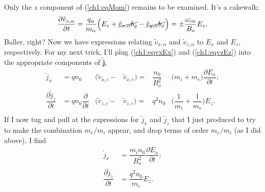 Only the $z$ component of (\ref{ch1:eqMom}) remains to be examined. It's a cakewalk:
\begin{equation} \label{ch1:eqvzEz} \dfrac{\partial \tilde
    v_{z,\alpha}}{\partial t} = \dfrac{q_\alpha}{m_\alpha} \Big ( E_z +
  \cancel{\tilde v_{x,\alpha} b_y} - \cancel{\tilde v_{y,\alpha} b_x} \Big ) =
  \pm \dfrac{\omega_{c \alpha}}{B_o} E_z.
\end{equation}
Baller, right? Now we have expressions relating $\tilde v_{x,\alpha}$ and
$\tilde v_{z,\alpha}$ to $E_x$ and $E_z$, respectively. For my next trick, I'll
plug (\ref{ch1:eqvxEx}) and (\ref{ch1:eqvzEz}) into the appropriate components
of $\mathbf{\tilde j}$,
\begin{equation*} 
  \begin{alignedat}{4}
    \tilde j_x                              &= q n_0 &\Big ( \tilde v_{x,i} - & \tilde v_{x,e} \Big ) = & \dfrac{n_0}{B_o^2} &\Big( m_i + m_e \Big) \dfrac{\partial E_x}{\partial t}; \\
    \dfrac{\partial \tilde j_z}{\partial t} &= q n_0 \dfrac{\partial}{\partial t} &\Big ( \tilde v_{z,i} - & \tilde v_{z,e} \Big ) =& q^2 n_0 &\Big( \dfrac{1}{m_i} + \dfrac{1}{m_e} \Big) E_z. \\
  \end{alignedat}
\end{equation*}
If I now tug and pull at the expressions for $\tilde j_x$ and $\tilde j_z$ that
I just produced to try to make the combination $m_e/m_i$ appear, and drop terms
of order $m_e / m_i$ (as I did above), I find
\begin{equation} \label{ch1:eqDaddy}
  \begin{alignedat}{4}
    \tilde j_x                              &= \dfrac{m_i n_0 }{B_o^2} \dfrac{\partial E_x}{\partial t}; \\
    \dfrac{\partial \tilde j_z}{\partial t} &= \dfrac{q^2 n_0 }{m_e} E_z. \\
  \end{alignedat}
\end{equation}


